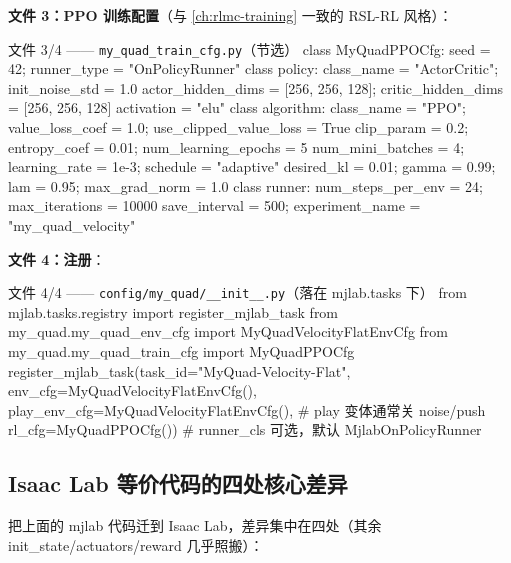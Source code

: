 \textbf{文件 3：PPO 训练配置}（与 \cref{ch:rlmc-training} 一致的 RSL-RL 风格）：

\begin{codebox}[Python]{文件 3/4 —— \texttt{my\_quad\_train\_cfg.py}（节选）}
class MyQuadPPOCfg:
    seed = 42; runner_type = "OnPolicyRunner"
    class policy:
        class_name = "ActorCritic"; init_noise_std = 1.0
        actor_hidden_dims = [256, 256, 128]; critic_hidden_dims = [256, 256, 128]
        activation = "elu"
    class algorithm:
        class_name = "PPO"; value_loss_coef = 1.0; use_clipped_value_loss = True
        clip_param = 0.2; entropy_coef = 0.01; num_learning_epochs = 5
        num_mini_batches = 4; learning_rate = 1e-3; schedule = "adaptive"
        desired_kl = 0.01; gamma = 0.99; lam = 0.95; max_grad_norm = 1.0
    class runner:
        num_steps_per_env = 24; max_iterations = 10000
        save_interval = 500; experiment_name = "my_quad_velocity"
\end{codebox}

\textbf{文件 4：注册}：

\begin{codebox}[Python]{文件 4/4 —— \texttt{config/my\_quad/\_\_init\_\_.py}（落在 mjlab.tasks 下）}
from mjlab.tasks.registry import register_mjlab_task
from my_quad.my_quad_env_cfg import MyQuadVelocityFlatEnvCfg
from my_quad.my_quad_train_cfg import MyQuadPPOCfg
register_mjlab_task(task_id="MyQuad-Velocity-Flat",
    env_cfg=MyQuadVelocityFlatEnvCfg(),
    play_env_cfg=MyQuadVelocityFlatEnvCfg(),   # play 变体通常关 noise/push
    rl_cfg=MyQuadPPOCfg())                      # runner_cls 可选，默认 MjlabOnPolicyRunner
\end{codebox}

\subsection{Isaac Lab 等价代码的四处核心差异}
\label{sec:rlmc-diy-fullcode-isaac}

把上面的 mjlab 代码迁到 Isaac Lab，差异集中在四处（其余 init\_state/actuators/reward 几乎照搬）：

